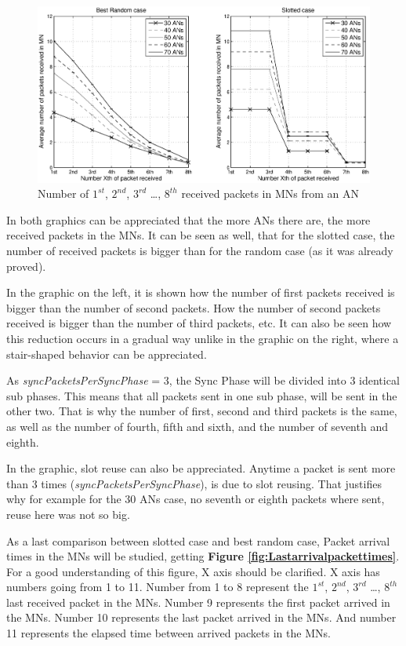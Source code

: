 \begin{figure}[ht]
 \begin{center}
  \includegraphics[width=1\textwidth]{numberOf1st2ndPacketsReceived.eps}
 \end{center}
 \caption{Number of $1^{st}$, $2^{nd}$, $3^{rd}$ \ldots, $8^{th}$ received packets in \acp{MN} from an \ac{AN}}
 \label{fig:numberOf1st2ndPacketsReceived}
\end{figure}

In both graphics can be appreciated that the more \acp{AN} there are, the more received packets in the \acp{MN}. It can be seen as well, that
for the slotted case, the number of received packets is bigger than for the random case (as it was already proved).

In the graphic on the left, it is shown how the number of first packets received is bigger than the number of second packets. How the number of 
second packets received is bigger than the number of third packets, etc. It can also be seen how this reduction occurs in a gradual way unlike 
in the graphic on the right, where a stair-shaped behavior can be appreciated.

As \textit{syncPacketsPerSyncPhase} = 3, the Sync Phase will be divided into 3 identical sub phases. This means that all packets sent in one sub 
phase, will be sent in the other two. That is why the number of first, second and third packets is the same, as well as the number of fourth, fifth 
and sixth, and the number of seventh and eighth.

In the graphic, slot reuse can also be appreciated. Anytime a packet is sent more than 3 times (\textit{syncPacketsPerSyncPhase}), is due to slot reusing. 
That justifies why for example for the 30 \acp{AN} case, no seventh or eighth packets where sent, reuse here was not so big.

As a last comparison between slotted case and best random case, Packet arrival times in the \acp{MN} will be studied, getting \textbf{Figure
\ref{fig:Lastarrivalpackettimes}}. For a good understanding of this figure, X axis should be clarified. X axis has numbers
going from 1 to 11. Number from 1 to 8 represent the $1^{st}$, $2^{nd}$, $3^{rd}$ \ldots, $8^{th}$ last received packet in the \acp{MN}. Number 9 
represents the first packet arrived in the \acp{MN}. Number 10 represents the last packet arrived in the \acp{MN}. And number 11 represents the elapsed 
time between arrived packets in the \acp{MN}.

